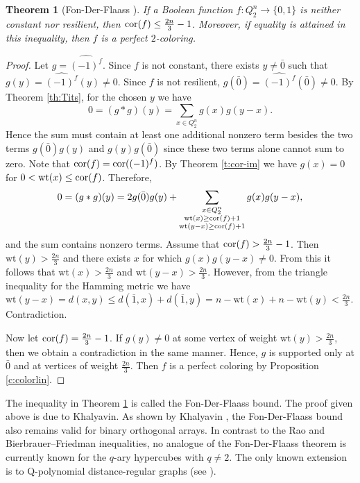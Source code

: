 \documentclass[11pt]{article}
\newtheorem{theorem}{Theorem}[section]
\theoremstyle{definition}
\newcommand{\cor}{{\rm cor}}
\begin{document}
{{{\begin{theorem}[Fon-Der-Flaass \cite{FdF2}]\label{thFdF}
    If a Boolean function $f: Q_2^n\rightarrow \{0,1\}$
    is neither constant nor resilient, then $\cor(f)\le \frac{2n}{3}-1$.
    Moreover, if equality is attained in this inequality,
    then $f$ is a perfect $2$-coloring.
\end{theorem}
\begin{proof}
    Let $g=\widehat{(-1)^f}$. Since $f$ is not constant,
    there exists $y\ne \bar{0}$ such that $g(y)=\widehat{(-1)^f}(y)\neq 0$. Since $f$
    is not resilient,
    $g(\bar{0})=\widehat{(-1)^f}(\bar{0})\neq 0$. By 
   Theorem \ref{th:Tits}, for the chosen $y$
    we have
    \[
    0=(g*g)(y)=\sum\limits_{x\in Q_2^n}g(x)g(y-x).
    \]
    Hence the sum must contain at least one additional nonzero term besides the two terms
     $g(\bar{0})g(y)$ and $g(y)g(\bar{0})$ since these two terms alone cannot sum to zero. Note that $\cor(f)=\cor((-1)^f)$.
    By Theorem \ref{t:cor-im} we have $g(x)=0$ for $0<\mathrm{wt}(x)\le
    \cor(f)$.
    Therefore,
    \[
    0=(g*g)(y)=2g(\bar{0})g(y)+\sum_{\substack{x\in Q_2^n\\ \mathrm{wt}(x)\geq\cor(f)+1\\
    \mathrm{wt}(y-x)\geq\cor(f)+1 }}g(x)g(y-x),
    \]
    and the sum  contains nonzero terms.
    Assume that $\cor(f)>\frac{2n}{3}-1$. Then
    $\mathrm{wt}(y)>\frac{2n}{3}$ and there exists $x$ for which $g(x)g(y-x)\neq 0$.
    From this it follows that $\mathrm{wt}(x)>\frac{2n}{3}$ and
    $\mathrm{wt}(y-x)>\frac{2n}{3}$. However, from the triangle
    inequality for the Hamming metric we have
    $\mathrm{wt}(y-x)=d(x,y)\leq
    d(\overline{1},x)+d(\overline{1},y)= n-\mathrm{wt}(x)+
    n-\mathrm{wt}(y)<\frac{2n}{3}$. Contradiction.

    Now let $\cor(f)=\frac{2n}{3}-1$. If $g(y)\neq 0$ at some vertex
    of weight $\mathrm{wt}(y)>\frac{2n}{3}$, then we obtain a contradiction in the same manner.
    Hence, $g$ is supported only at $\bar 0$ and at 
    vertices of weight
    $\frac{2n}{3}$. Then
    $f$ is a perfect coloring by
    Proposition \ref{c:colorlin}.
\end{proof}

The inequality in Theorem \ref{thFdF} is called the Fon-Der-Flaass
bound. The proof given above is due to
Khalyavin. As shown by Khalyavin \cite{Halyav}, the Fon-Der-Flaass
bound also remains valid  for binary orthogonal arrays.
In contrast to the Rao and Bierbrauer--Friedman inequalities,
no analogue of the Fon-Der-Flaass theorem  is currently  known for the $q$-ary hypercubes 
with $q\neq 2$.
The only known extension is to Q-polynomial distance-regular graphs (see \cite{CRCKP}).

}}}
\end{document}
